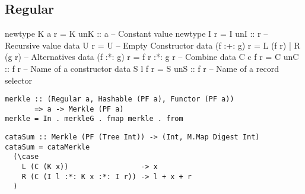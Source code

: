 \subsection{Regular}

\begin{haskell}
newtype K a r    = K { unK :: a}     -- Constant value
newtype I r      = I { unI :: r }    -- Recursive value
data U r         = U                 -- Empty Constructor
data (f :+: g) r = L (f r) | R (g r) -- Alternatives
data (f :*: g) r = f r :*: g r       -- Combine
data C c f r     = C { unC :: f r }  -- Name of a constructor
data S l f r     = S { unS :: f r }  -- Name of a record selector
\end{haskell}

\begin{verbatim}
merkle :: (Regular a, Hashable (PF a), Functor (PF a))
       => a -> Merkle (PF a)
merkle = In . merkleG . fmap merkle . from
\end{verbatim}

\begin{verbatim}
cataSum :: Merkle (PF (Tree Int)) -> (Int, M.Map Digest Int)
cataSum = cataMerkle
  (\case
    L (C (K x))                 -> x
    R (C (I l :*: K x :*: I r)) -> l + x + r
  )
\end{verbatim}
